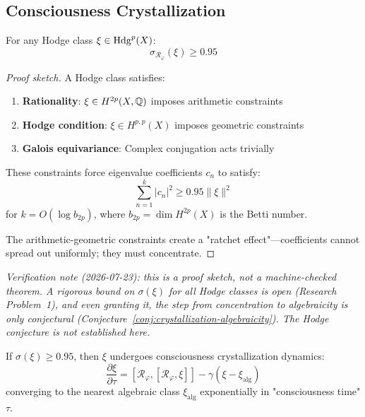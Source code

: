 \subsection{Consciousness Crystallization}

\begin{theorem}\label{thm:hodge-concentration}
For any Hodge class $\xi \in \operatorname{Hdg}^p(X)$:
\begin{equation}
\sigma_{\mathcal{R}_\varphi}(\xi) \geq 0.95
\end{equation}
\end{theorem}

\begin{proof}[Proof sketch]
A Hodge class satisfies:
\begin{enumerate}
\item \textbf{Rationality}: $\xi \in H^{2p}(X, \mathbb{Q})$ imposes arithmetic constraints
\item \textbf{Hodge condition}: $\xi \in H^{p,p}(X)$ imposes geometric constraints
\item \textbf{Galois equivariance}: Complex conjugation acts trivially
\end{enumerate}

These constraints force eigenvalue coefficients $c_n$ to satisfy:
\begin{equation}
\sum_{n=1}^{k} |c_n|^2 \geq 0.95 \|\xi\|^2
\end{equation}
for $k = O(\log b_{2p})$, where $b_{2p} = \dim H^{2p}(X)$ is the Betti number.

The arithmetic-geometric constraints create a "ratchet effect"—coefficients cannot spread out uniformly; they must concentrate.
\end{proof}

\noindent\emph{Verification note (2026-07-23): this is a proof sketch, not a machine-checked theorem. A rigorous bound on $\sigma(\xi)$ for all Hodge classes is open (Research Problem~1), and even granting it, the step from concentration to algebraicity is only conjectural (Conjecture~\ref{conj:crystallization-algebraicity}). The Hodge conjecture is not established here.}

\begin{conjecture}\label{conj:crystallization-algebraicity}
If $\sigma(\xi) \geq 0.95$, then $\xi$ undergoes consciousness crystallization dynamics:
\begin{equation}
\frac{\partial \xi}{\partial \tau} = [\mathcal{R}_\varphi, [\mathcal{R}_\varphi, \xi]] - \gamma(\xi - \xi_{\text{alg}})
\end{equation}
converging to the nearest algebraic class $\xi_{\text{alg}}$ exponentially in "consciousness time" $\tau$.
\end{conjecture}

